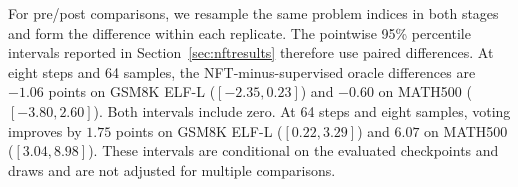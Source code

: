 For pre/post comparisons, we resample the same problem indices in both stages and form the difference within each replicate. The pointwise 95\% percentile intervals reported in Section~\ref{sec:nftresults} therefore use paired differences. At eight steps and 64 samples, the NFT-minus-supervised oracle differences are $-1.06$ points on GSM8K ELF-L ($[-2.35,0.23]$) and $-0.60$ on MATH500 ($[-3.80,2.60]$). Both intervals include zero. At 64 steps and eight samples, voting improves by $1.75$ points on GSM8K ELF-L ($[0.22,3.29]$) and $6.07$ on MATH500 ($[3.04,8.98]$). These intervals are conditional on the evaluated checkpoints and draws and are not adjusted for multiple comparisons.




